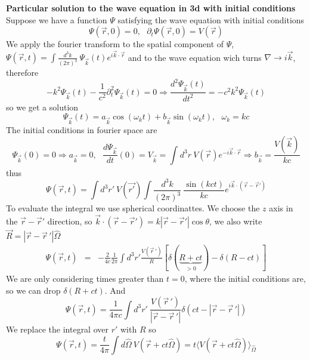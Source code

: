 \documentclass[12pt,a4paper]{article}
\newcommand{\dt}[1]{\frac{d #1}{dt}} %
\newcommand{\der}[2]{\frac{d #1}{d #2}} %
\newcommand{\integral}[3]{\int_{#1}^{#2} d #3 \ } %
\begin{document}
\textbf{Particular solution to the wave equation in 3d with initial conditions}\\
Suppose we have a function $\Psi$ satisfying the wave equation with initial conditions
\begin{equation}
	\Psi(\vec{r},0) = 0, \ \ \ \partial_t \Psi(\vec{r},0) = V(\vec{r})
\end{equation}
We apply the fourier transform to the spatial component of $\Psi$, $\Psi(\vec{r},t) = \int{\frac{d^3k}{(2\pi)^3}}\  \Psi_{\vec{k}}(t)e^{i\vec{k}\cdot\vec
r}$ and to the wave equation wich turns $\nabla \rightarrow i\vec{k}$, therefore
\begin{equation}
-k^2 \Psi_{\vec{k}}(t) -\frac{1}{c^2}\partial_t^2\Psi_{\vec{k}}(t) = 0 \Rightarrow \der{^2\Psi_{\vec{k}}(t)}{t^2} = - c^2k^2\Psi_{\vec{k}}(t)
\end{equation}
so we get a solution
\begin{equation}
\Psi_{\vec{k}}(t) = a_{\vec{k}} \cos (\omega_k t) + b_{\vec{k}} \sin (\omega_k t), \ \ \ \omega_k = kc
\end{equation}
The initial conditions in fourier space are
\begin{equation}
	\Psi_{\vec{k}}(0) = 0 \Rightarrow a_{\vec{k}} = 0, \ \ \ \dt{\Psi_{\vec{k}}}(0) = V_{\vec{k}} = \integral{}{}{^3r} V(\vec{r})e^{-i\vec{k}\cdot\vec{r}} \Rightarrow  b_{\vec{k}} = \frac{V(\vec{k})}{kc}
\end{equation}
thus
\begin{equation}
\Psi(\vec{r},t) = \int d^3 r' \ V(\vec{r'}) \int \frac{d^3k}{(2\pi)^3}\ \frac{\sin (kct)}{kc} e^{i\vec{k}\cdot(\vec{r}-\vec{r}')}  
\end{equation}
To evaluate the integral we use spherical coordinattes. We choose the $z$ axis in the $\vec{r}-\vec{r}'$ direction, so $\vec{k}\cdot(\vec{r}-\vec{r}') = k|\vec{r}-\vec{r}'|\cos \theta$, we also write $\vec{R} = |\vec{r}-\vec{r}\,'|\hat{\Omega}$ 
\begin{eqnarray}
	\Psi(\vec{r},t)& = & -\frac{2}{4c} \frac{1}{2\pi} \int d^3r' \frac{V(\vec{r}\,')}{R} \left[\delta(\underbrace{R+ct}_{>0}) - \delta(R-ct) \right]
\end{eqnarray}
We are only considering times greater than $t = 0$, where the initial conditions are, so we can drop $\delta(R+ct)$. And 
\begin{equation}
	\Psi(\vec{r},t) = \frac{1}{4\pi c} \int d^3r' \  \frac{V(\vec{r}\,')}{|\vec{r}-\vec{r}\,'|} \delta(ct-|\vec{r}-\vec{r}\,'|)
\end{equation}
We replace the integral over $r'$ with $R$ so
\begin{equation}
	\Psi(\vec{r},t) = \frac{t}{4\pi} \int d\hat{\Omega} \ V(\vec{r} + ct\hat{\Omega}) = t \langle V(\vec{r} + ct\hat{\Omega}) \rangle_{\hat{\Omega}}
\end{equation}
\end{document}
